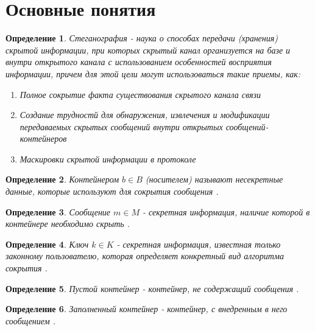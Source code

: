 \documentclass[a4paper,12pt]{article}
\theoremstyle{plain}
\newtheorem{definition}{Определение}[section]
\begin{document}
\section{Основные понятия}
\vspace*{1cm}
\begin{definition}\label{stegonagraphy}
Стеганография - наука о способах передачи (хранения) скрытой информации, при которых скрытый канал организуется на базе и внутри открытого канала с использованием особенностей восприятия информации, причем для этой цели могут использоваться такие приемы, \cite{agranovskiy}как:
\begin{enumerate}
	\item Полное сокрытие факта существования  скрытого канала связи
	\item Создание трудностй для обнаружения, извлечения и модификации передаваемых скрытых сообщений внутри открытых сообщений-контейнеров
	\item Маскировки скрытой информации в протоколе
\end{enumerate}
\end{definition}

\begin{definition}\label{container}
	Контейнером $b \in B$ (носителем) называют несекретные данные, которые используют для сокрытия сообщения \cite{agranovskiy}.
\end{definition}

\begin{definition}\label{message}
	Сообщение $m \in M$ - секретная информация, наличие которой в контейнере необходимо скрыть \cite{agranovskiy}.
\end{definition}

\begin{definition}\label{key}
	Ключ $k \in K$ - секретная информация, известная только законному пользователю, которая определяет конкретный вид алгоритма сокрытия \cite{agranovskiy}.
\end{definition}

\begin{definition}\label{free container}
	Пустой контейнер - контейнер, не содержащий сообщения \cite{agranovskiy}.
\end{definition}

\begin{definition}\label{full container}
	Заполненный контейнер - контейнер, с внедренным в него сообщением \cite{agranovskiy}.
\end{definition}
\end{document}
